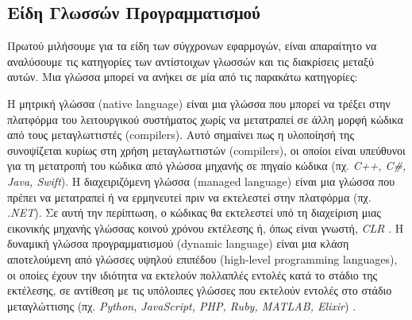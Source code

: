 \subsection{Είδη Γλωσσών Προγραμματισμού}
Πρωτού μιλήσουμε για τα είδη των σύγχρονων εφαρμογών, είναι απαραίτητο να αναλύσουμε τις κατηγορίες των αντίστοιχων γλωσσών και τις διακρίσεις μεταξύ αυτών. Μια γλώσσα μπορεί να ανήκει σε μία από τις παρακάτω κατηγορίες:
\begin{description}[font=$\bullet$~\normalfont\color{black}]
\item [Μετταγλωτισμένες ή Μητρικές γλώσσες (\selectlanguage{english}Compiled or Native Languages)]
\item [Διαχειριζόμενες Γλώσσες (\selectlanguage{english}Managed Languages)]
\item [Δυναμικές Γλώσσες (\selectlanguage{english}Dynamic Languages)]
\end{description}Η μητρική γλώσσα (native language) είναι μια γλώσσα που μπορεί να τρέξει στην πλατφόρμα του λειτουργικού συστήματος χωρίς να μετατραπεί σε άλλη μορφή κώδικα από τους μεταγλωττιστές (compilers). Αυτό σημαίνει πως η υλοποίησή της συνοψίζεται κυρίως στη χρήση μεταγλωττιστών (compilers), οι οποίοι είναι υπεύθυνοι για τη μετατροπή του κώδικα από γλώσσα μηχανής σε πηγαίο κώδικα (πχ. \textit{C++, C\#, Java, Swift}). Η διαχειριζόμενη γλώσσα (managed language) είναι μια γλώσσα που πρέπει να μετατραπεί ή να ερμηνευτεί πριν να εκτελεστεί στην πλατφόρμα (πχ. \textit{.NET}). Σε αυτή την περίπτωση, ο κώδικας θα εκτελεστεί υπό τη διαχείριση μιας εικονικής μηχανής γλώσσας κοινού χρόνου εκτέλεσης ή, όπως είναι γνωστή, \textit{CLR} \cite{[STR+09],[DEV+03]}. Η δυναμική γλώσσα προγραμματισμού (dynamic language) είναι μια κλάση αποτελούμενη από γλώσσες υψηλού επιπέδου (high-level programming languages), οι οποίες έχουν την ιδιότητα να εκτελούν πολλαπλές εντολές κατά το στάδιο της εκτέλεσης, σε αντίθεση με τις υπόλοιπες γλώσσες που εκτελούν εντολές στο στάδιο μεταγλώττισης  (πχ. \textit{Python, JavaScript, PHP, Ruby, MATLAB, Elixir}) \cite{[MIC05], [ADV09]}.

